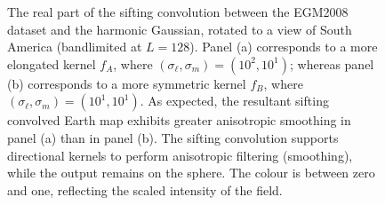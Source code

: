 \begin{figure}[htpb]
\centering\capstart{}
\hfill
{}
\caption[
Two harmonic Gaussians convolved with a map of the Earth
]{
The real part of the sifting convolution between the EGM2008 dataset and the harmonic Gaussian, rotated to a view of South America (bandlimited at \(L=128\)).
Panel (a) corresponds to a more elongated kernel \(f_{A}\), where \((\sigma_{\ell},\sigma_{m}) = (10^{2}, 10^{1})\); whereas panel (b) corresponds to a more symmetric kernel \(f_{B}\), where \((\sigma_{\ell},\sigma_{m}) = (10^{1}, 10^{1})\).
As expected, the resultant sifting convolved Earth map exhibits greater anisotropic smoothing in panel (a) than in panel (b).
The sifting convolution supports directional kernels to perform anisotropic filtering (smoothing), while the output remains on the sphere.
The colour is between zero and one, reflecting the scaled intensity of the field.
}\label{fig:chapter3_convolved}
\end{figure}
